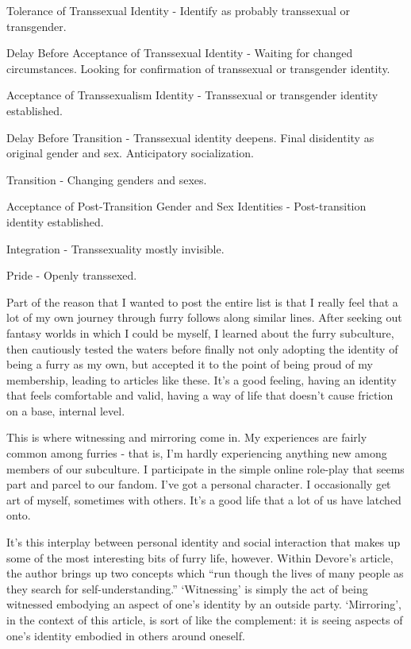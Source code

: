Tolerance of Transsexual Identity - Identify as probably transsexual or transgender.

Delay Before Acceptance of Transsexual Identity - Waiting for changed circumstances. Looking for confirmation of transsexual or transgender identity.

Acceptance of Transsexualism Identity - Transsexual or transgender identity established.

Delay Before Transition - Transsexual identity deepens. Final disidentity as original gender and sex. Anticipatory socialization.

Transition - Changing genders and sexes.

Acceptance of Post-Transition Gender and Sex Identities - Post-transition identity established.

Integration - Transsexuality mostly invisible.

Pride - Openly transsexed.

Part of the reason that I wanted to post the entire list is that I really feel that a lot of my own journey through furry follows along similar lines. After seeking out fantasy worlds in which I could be myself, I learned about the furry subculture, then cautiously tested the waters before finally not only adopting the identity of being a furry as my own, but accepted it to the point of being proud of my membership, leading to articles like these. It's a good feeling, having an identity that feels comfortable and valid, having a way of life that doesn't cause friction on a base, internal level.

This is where witnessing and mirroring come in. My experiences are fairly common among furries - that is, I'm hardly experiencing anything new among members of our subculture. I participate in the simple online role-play that seems part and parcel to our fandom. I've got a personal character. I occasionally get art of myself, sometimes with others. It's a good life that a lot of us have latched onto.

It's this interplay between personal identity and social interaction that makes up some of the most interesting bits of furry life, however. Within Devore's article, the author brings up two concepts which ``run though the lives of many people as they search for self-understanding.'' `Witnessing' is simply the act of being witnessed embodying an aspect of one's identity by an outside party. `Mirroring', in the context of this article, is sort of like the complement: it is seeing aspects of one's identity embodied in others around oneself.

